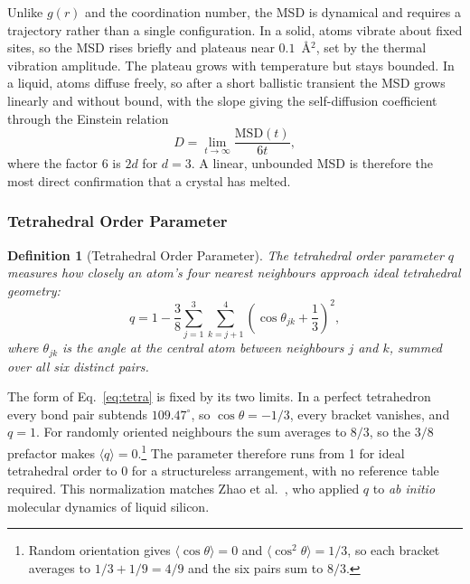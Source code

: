 \documentclass{article}
\newtheorem{definition}{Definition}
\begin{document}
Unlike $g(r)$ and the coordination number, the MSD is dynamical and requires a trajectory rather than a single configuration. In a solid, atoms vibrate about fixed sites, so the MSD rises briefly and plateaus near $0.1$~\AA$^2$, set by the thermal vibration amplitude. The plateau grows with temperature but stays bounded. In a liquid, atoms diffuse freely, so after a short ballistic transient the MSD grows linearly and without bound, with the slope giving the self-diffusion coefficient through the Einstein relation
\begin{equation}
    D = \lim_{t \to \infty} \frac{\text{MSD}(t)}{6t},
    \label{eq:einstein}
\end{equation}
where the factor 6 is $2d$ for $d = 3$. A linear, unbounded MSD is therefore the most direct confirmation that a crystal has melted.

\subsubsection{Tetrahedral Order Parameter}
\label{TOP}
\begin{definition}[Tetrahedral Order Parameter]
    The tetrahedral order parameter $q$ measures how closely an atom's four
    nearest neighbours approach ideal tetrahedral geometry:
    \begin{equation}
        q = 1 - \frac{3}{8}\sum_{j=1}^{3}\sum_{k=j+1}^{4}
            \left( \cos\theta_{jk} + \frac{1}{3} \right)^{2},
        \label{eq:tetra}
    \end{equation}
    where $\theta_{jk}$ is the angle at the central atom between neighbours $j$ and $k$, summed over all six distinct pairs.
\end{definition}

The form of Eq.~\ref{eq:tetra} is fixed by its two limits. In a perfect tetrahedron every bond pair subtends $109.47^\circ$, so $\cos\theta = -1/3$, every bracket vanishes, and $q = 1$. For randomly oriented neighbours the sum averages to $8/3$, so the $3/8$ prefactor makes $\langle q \rangle = 0$.\footnote{Random orientation gives $\langle\cos\theta\rangle = 0$ and $\langle\cos^{2}\theta\rangle = 1/3$, so each bracket averages to $1/3 + 1/9 = 4/9$ and the six pairs sum to $8/3$.} The parameter therefore runs from 1 for ideal tetrahedral order to 0 for a structureless arrangement, with no reference table required. This normalization matches Zhao et al.~\cite{zhao2017}, who applied $q$ to \textit{ab initio} molecular dynamics of liquid silicon.
\end{document}
